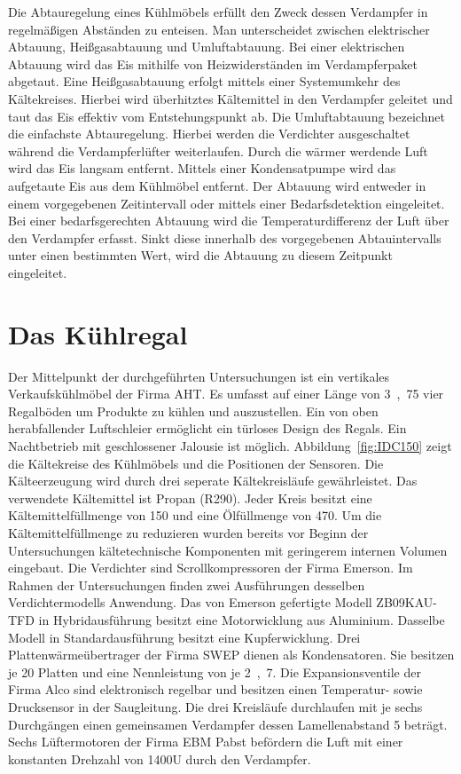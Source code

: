 Die Abtauregelung eines Kühlmöbels erfüllt den Zweck dessen Verdampfer in regelmäßigen Abständen zu enteisen. Man unterscheidet zwischen elektrischer Abtauung, Heißgasabtauung und Umluftabtauung. Bei einer elektrischen Abtauung wird das Eis mithilfe von Heizwiderständen im Verdampferpaket abgetaut. Eine Heißgasabtauung erfolgt mittels einer Systemumkehr des Kältekreises. Hierbei wird überhitztes Kältemittel in den Verdampfer geleitet und taut das Eis effektiv vom Entstehungspunkt ab. Die Umluftabtauung bezeichnet die einfachste Abtauregelung. Hierbei werden die Verdichter ausgeschaltet während die Verdampferlüfter weiterlaufen. Durch die wärmer werdende Luft wird das Eis langsam entfernt. Mittels einer Kondensatpumpe wird das aufgetaute Eis aus dem Kühlmöbel entfernt. \newline
Der Abtauung wird entweder in einem vorgegebenen Zeitintervall oder mittels einer Bedarfsdetektion eingeleitet. Bei einer bedarfsgerechten Abtauung wird die Temperaturdifferenz der Luft über den Verdampfer erfasst. Sinkt diese innerhalb des vorgegebenen Abtauintervalls unter einen bestimmten Wert, wird die Abtauung zu diesem Zeitpunkt eingeleitet.


\section{Das Kühlregal}
\label{sec:Das Kühlregal}

Der Mittelpunkt der durchgeführten Untersuchungen ist ein vertikales Verkaufskühlmöbel der Firma AHT.
Es umfasst auf einer Länge von \unit{3,75}{\metre} vier Regalböden um Produkte zu kühlen und auszustellen. Ein von oben herabfallender Luftschleier ermöglicht ein türloses Design des Regals. Ein Nachtbetrieb mit geschlossener Jalousie ist möglich. Abbildung~\ref{fig:IDC150} zeigt die Kältekreise des Kühlmöbels und die Positionen der Sensoren. Die Kälteerzeugung wird durch drei seperate Kältekreisläufe gewährleistet. Das verwendete Kältemittel ist Propan (R290). Jeder Kreis besitzt eine Kältemittelfüllmenge von \unit{150}{\gram} und eine Ölfüllmenge von \unit{470}{\gram}. Um die Kältemittelfüllmenge zu reduzieren wurden bereits vor Beginn der Untersuchungen kältetechnische Komponenten mit geringerem internen Volumen eingebaut. Die Verdichter sind Scrollkompressoren der Firma Emerson.  Im Rahmen der Untersuchungen finden zwei Ausführungen desselben Verdichtermodells Anwendung. Das von Emerson gefertigte Modell ZB09KAU-TFD in Hybridausführung besitzt eine Motorwicklung aus Aluminium. Dasselbe Modell in Standardausführung besitzt eine Kupferwicklung. Drei Plattenwärmeübertrager der Firma SWEP dienen als Kondensatoren. Sie besitzen je 20 Platten und eine Nennleistung von je \unit{2,7}{\kilo\watt}. Die Expansionsventile der Firma Alco sind elektronisch regelbar und besitzen einen Temperatur- sowie Drucksensor in der Saugleitung. Die drei Kreisläufe durchlaufen mit je sechs Durchgängen einen gemeinsamen Verdampfer dessen Lamellenabstand \unit{5}{\milli\metre} beträgt. Sechs Lüftermotoren der Firma EBM Pabst befördern die Luft mit einer konstanten Drehzahl von \unit{1400}{U\per\min} durch den Verdampfer.

